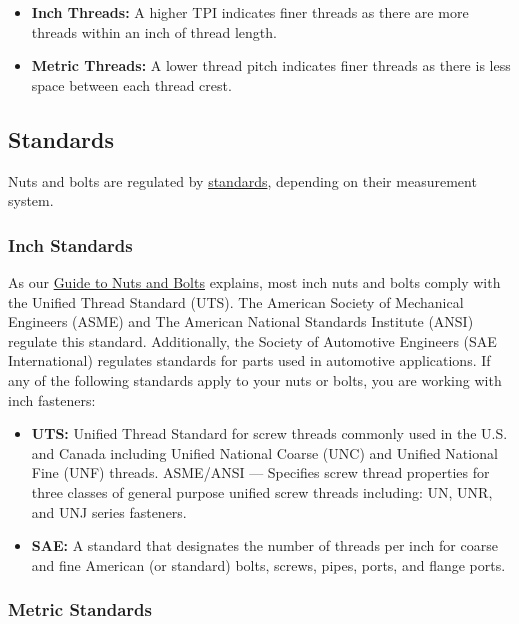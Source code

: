 \documentclass[english,]{article}
\providecommand{\tightlist}{%
  \setlength{\itemsep}{0pt}\setlength{\parskip}{0pt}}
\begin{document}
\begin{itemize}
\tightlist
\item
  \textbf{Inch Threads:} A higher TPI indicates finer threads as there
  are more threads within an inch of thread length.
\item
  \textbf{Metric Threads:} A lower thread pitch indicates finer threads
  as there is less space between each thread crest.
\end{itemize}

\hypertarget{ibnyqd}{%
\subsection{Standards}\label{ibnyqd}}

\hypertarget{icngzy}{}
Nuts and bolts are regulated by
\href{https://www.huyett.com/blog-why-are-standards-important}{standards},
depending on their measurement system.

\hypertarget{iibhbc}{%
\subsubsection{Inch Standards}\label{iibhbc}}

\hypertarget{i9sheb}{}
As our \href{https://www.huyett.com/blog-nuts-and-bolts}{Guide to Nuts
and Bolts} explains, most inch nuts and bolts comply with the Unified
Thread Standard (UTS). The American Society of Mechanical Engineers
(ASME) and The American National Standards Institute (ANSI) regulate
this standard. Additionally, the Society of Automotive Engineers (SAE
International) regulates standards for parts used in automotive
applications. If any of the following standards apply to your nuts or
bolts, you are working with inch fasteners:

\begin{itemize}
\tightlist
\item
  \textbf{UTS:} Unified Thread Standard for screw threads commonly used
  in the U.S. and Canada including Unified National Coarse (UNC) and
  Unified National Fine (UNF) threads. ASME/ANSI --- Specifies screw
  thread properties for three classes of general purpose unified screw
  threads including: UN, UNR, and UNJ series fasteners.
\item
  \textbf{SAE:} A standard that designates the number of threads per
  inch for coarse and fine American (or standard) bolts, screws, pipes,
  ports, and flange ports.
\end{itemize}

\hypertarget{i9a69k}{%
\subsubsection{Metric Standards}\label{i9a69k}}
\end{document}
